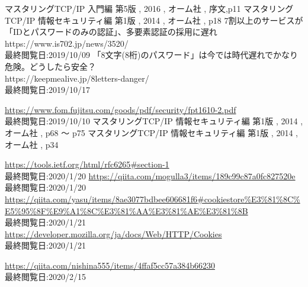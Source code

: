 \def\line{−\hspace*{-.7zw}−}

\begin{thebibliography}{99}


 マスタリングTCP/IP 入門編 第5版 , 2016 , オーム社 , 序文,p11
 マスタリングTCP/IP 情報セキュリティ編 第1版 , 2014 , オーム社 , p18
 7割以上のサービスが「IDとパスワードのみの認証」、多要素認証の採用に遅れ\\ https://www.is702.jp/news/3520/ \\最終閲覧日:2019/10/09
 「8文字(8桁)のパスワード」は今では時代遅れでかなり危険。どうしたら安全？ \\ https://keepmealive.jp/8letters-danger/ \\最終閲覧日:2019/10/17

 \url{https://www.fom.fujitsu.com/goods/pdf/security/fpt1610-2.pdf} \\最終閲覧日:2019/10/10
 マスタリングTCP/IP 情報セキュリティ編 第1版 , 2014 , オーム社 , p68 〜 p75 
 マスタリングTCP/IP 情報セキュリティ編 第1版 , 2014 , オーム社 , p34 



 \url{https://tools.ietf.org/html/rfc6265#section-1} \\ 最終閲覧日:2020/1/20
 \url{https://qiita.com/mogulla3/items/189c99c87a0fc827520e} \\ 最終閲覧日:2020/1/20
 \url{https://qiita.com/yasu/items/8ae3077bdbee606681f6#cookiestore%E3%81%8C%E5%95%8F%E9%A1%8C%E3%81%AA%E3%81%AE%E3%81%8B} \\ 最終閲覧日:2020/1/21
 \url{https://developer.mozilla.org/ja/docs/Web/HTTP/Cookies} \\最終閲覧日:2020/1/21



 \url{https://qiita.com/nishina555/items/4ffaf5cc57a384b66230} \\ 最終閲覧日:2020/2/15

\end{thebibliography}


